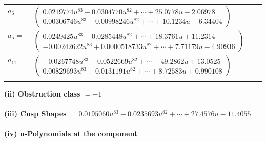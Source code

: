 \documentclass[1p]{elsarticle_modified}
\theoremstyle{definition}
\begin{document}
\begin{tabular}{m{7pt} m{180pt} m{7pt} m{180pt} }
\flushright $a_{6}=$&$\begin{pmatrix}0.0219774 u^{83}-0.0304770 u^{82}+\cdots+25.0778 u-2.06978\\0.00306746 u^{83}-0.00998246 u^{82}+\cdots+10.1234 u-6.34404\end{pmatrix}$ \\
\flushright $a_{5}=$&$\begin{pmatrix}0.0249425 u^{83}-0.0285448 u^{82}+\cdots+18.3761 u+11.2314\\-0.00242622 u^{83}+0.0000518733 u^{82}+\cdots+7.71179 u-4.90936\end{pmatrix}$ \\
\flushright $a_{11}=$&$\begin{pmatrix}-0.0267748 u^{83}+0.0522669 u^{82}+\cdots-49.2862 u+13.0525\\0.00829693 u^{83}-0.0131191 u^{82}+\cdots+8.72583 u+0.990108\end{pmatrix}$\\&\end{tabular}
\flushleft \textbf{(ii) Obstruction class $= -1$}\\~\\
\flushleft \textbf{(iii) Cusp Shapes $= 0.0195060 u^{83}-0.0235693 u^{82}+\cdots+27.4576 u-11.4055$}\\~\\
\newpage\renewcommand{\arraystretch}{1}
\flushleft \textbf{(iv) u-Polynomials at the component}\newline \\
\end{document}
